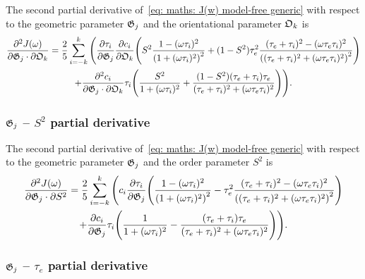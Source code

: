 The second partial derivative of~\eqref{eq: maths: J(w) model-free generic} with respect to the geometric parameter $\mathfrak{G}_j$ and the orientational parameter $\mathfrak{O}_k$ is
\begin{multline}
    \frac{\partial^2 J(\omega)}{\partial \mathfrak{G}_j \cdot \partial \mathfrak{O}_k} = \frac{2}{5} \sum_{i=-k}^k \Bigg(
        \frac{\partial \tau_i}{\partial \mathfrak{G}_j} \frac{\partial c_i}{\partial \mathfrak{O}_k} \Bigg(
            S^2 \frac{1 - (\omega \tau_i)^2}{\left(1 + (\omega \tau_i)^2 \right)^2}
            + (1 - S^2) \tau_e^2 \frac{(\tau_e + \tau_i)^2 - (\omega \tau_e \tau_i)^2}{\left((\tau_e + \tau_i)^2 + (\omega \tau_e \tau_i)^2 \right)^2}
        \Bigg) \\
        +  \frac{\partial^2 c_i}{\partial \mathfrak{G}_j \cdot \partial \mathfrak{O}_k} \tau_i \Bigg(
            \frac{S^2}{1 + (\omega \tau_i)^2}
            + \frac{(1 - S^2)(\tau_e + \tau_i)\tau_e}{(\tau_e + \tau_i)^2 + (\omega \tau_e \tau_i)^2}
        \Bigg)
    \Bigg).
\end{multline}



\subsubsection{$\mathfrak{G}_j$ -- $S^2$ partial derivative}

The second partial derivative of~\eqref{eq: maths: J(w) model-free generic} with respect to the geometric parameter $\mathfrak{G}_j$ and the order parameter $S^2$ is
\begin{multline}
    \frac{\partial^2 J(\omega)}{\partial \mathfrak{G}_j \cdot \partial S^2} = \frac{2}{5} \sum_{i=-k}^k \Bigg(
        c_i \frac{\partial \tau_i}{\partial \mathfrak{G}_j} \Bigg(
            \frac{1 - (\omega \tau_i)^2}{\left(1 + (\omega \tau_i)^2 \right)^2}
            - \tau_e^2 \frac{(\tau_e + \tau_i)^2 - (\omega \tau_e \tau_i)^2}{\left((\tau_e + \tau_i)^2 + (\omega \tau_e \tau_i)^2 \right)^2}
        \Bigg) \\
        +  \frac{\partial c_i}{\partial \mathfrak{G}_j} \tau_i \Bigg(
            \frac{1}{1 + (\omega \tau_i)^2}
            - \frac{(\tau_e + \tau_i)\tau_e}{(\tau_e + \tau_i)^2 + (\omega \tau_e \tau_i)^2}
        \Bigg)
    \Bigg).
\end{multline}



\subsubsection{$\mathfrak{G}_j$ -- $\tau_e$ partial derivative}

